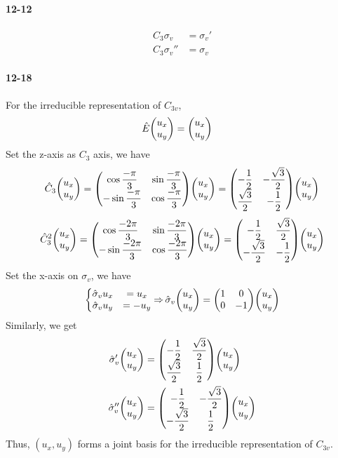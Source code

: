 \documentclass[a4paper]{article}
\DeclareMathOperator{\dra}{\Rightarrow}
\newcommand{\ex}[1]{\paragraph{12-#1}}
\numberwithin{equation}{section}
\begin{document}
\ex{12}
\begin{align}
C_3\sigma_v &= \sigma_v'\\
C_3\sigma_v'' &= \sigma_v
\end{align}

\ex{18}
For the irreducible representation of $ C_{3v} $,
\begin{align}
\hat{E}\mqty(u_x\\ u_y) &= \mqty(u_x\\ u_y)
\end{align}
Set the z-axis as $ C_3 $ axis, we have
\begin{equation}\label{key}
\hat{C}_3\mqty(u_x\\ u_y) = \mqty(\cos\dfrac{-\pi}{3} & \sin\dfrac{-\pi}{3}\\ -\sin\dfrac{-\pi}{3} & \cos\dfrac{-\pi}{3})\mqty(u_x\\ u_y) 
= \mqty(-\dfrac{1}{2} & -\dfrac{\sqrt{3}}{2}\\ \dfrac{\sqrt{3}}{2} & -\dfrac{1}{2})\mqty(u_x\\ u_y)
\end{equation}
\begin{equation}\label{key}
\hat{C}_3^2\mqty(u_x\\ u_y) = \mqty(\cos\dfrac{-2\pi}{3} & \sin\dfrac{-2\pi}{3}\\ -\sin\dfrac{-2\pi}{3} & \cos\dfrac{-2\pi}{3})\mqty(u_x\\ u_y) 
= \mqty(-\dfrac{1}{2} & \dfrac{\sqrt{3}}{2}\\ -\dfrac{\sqrt{3}}{2} & -\dfrac{1}{2})\mqty(u_x\\ u_y)
\end{equation}
Set the x-axis on $ \sigma_v $, we have
\begin{equation}\label{key}
\left\{\mqty{\hat\sigma_v u_x &= u_x\\ \hat\sigma_v u_y &= -u_y} \right.
\dra \hat\sigma_v\mqty(u_x\\ u_y) = \mqty(1 & 0\\ 0 & -1)\mqty(u_x\\ u_y)
\end{equation}
Similarly, we get
\begin{align}
\hat\sigma_v'\mqty(u_x\\ u_y) &= \mqty(-\dfrac{1}{2} & \dfrac{\sqrt{3}}{2}\\ \dfrac{\sqrt{3}}{2} & \dfrac{1}{2})\mqty(u_x\\ u_y)\\
\hat\sigma_v''\mqty(u_x\\ u_y) &= \mqty(-\dfrac{1}{2} & -\dfrac{\sqrt{3}}{2}\\ -\dfrac{\sqrt{3}}{2} & \dfrac{1}{2})\mqty(u_x\\ u_y)
\end{align}
Thus, $ (u_x, u_y) $ forms a joint basis for the irreducible representation of $ C_{3v} $.
\end{document}
